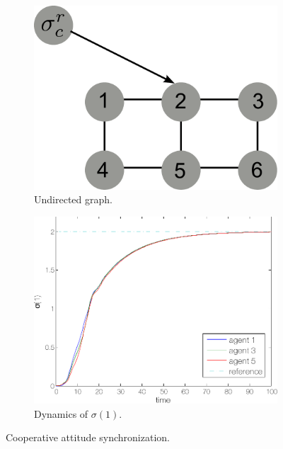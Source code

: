 \begin{figure}
\centering
\begin{subfigure}{0.3\linewidth}
\includegraphics[width=\linewidth]{./images/csa_graph}
\caption{Undirected graph.}
\label{fig:cas:sims:graph}
\end{subfigure}
\begin{subfigure}{0.3\linewidth}
\includegraphics[width=\linewidth]{./images/cas_D1_1_3_5_dyn}
\caption{Dynamics of $ \sigma(1) $.}
\label{fig:cas:sims:dyn}
\end{subfigure}
\caption{Cooperative attitude synchronization.}
\label{fig:cas:sims}
\end{figure}

